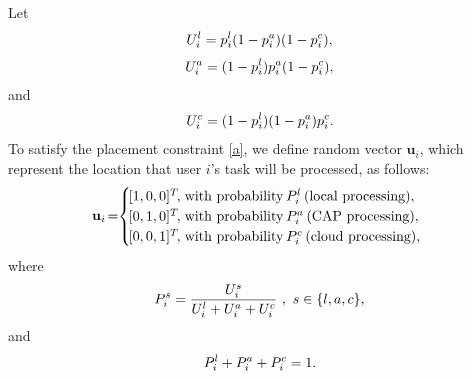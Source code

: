 \documentclass[10pt,journal,compsoc]{IEEEtran}
\begin{document}
{Let
\begin{align}
U^l_i=p^l_i(1-p^a_i)(1-p^c_i),\nonumber\allowdisplaybreaks
\end{align}
\begin{align}
U^a_i=(1-p^l_i)p^a_i(1-p^c_i),\nonumber\allowdisplaybreaks
\end{align}
and
\begin{align}
U^c_i=(1-p^l_i)(1-p^a_i)p^c_i.\nonumber\allowdisplaybreaks
\end{align}
To satisfy the placement constraint \eqref{a}, we define random
vector $\mathbf{u}_i$, which represent the location that user $i$'s
task will be processed, as follows:
\begin{equation}\label{Eq_u_i}
\hspace*{-.15cm}\mathbf{u}_i \hspace*{-.05cm}=\hspace*{-.1cm}
\begin{cases}
\hspace*{-.05cm}[1,0,0]^T\hspace*{-.05cm},&\hspace*{-.25cm}\text{with probability}\ \hspace*{-.05cm}P^l_i\ \hspace*{-.05cm}\text{(local processing)},\\
\hspace*{-.05cm}[0,1,0]^T\hspace*{-.05cm},&\hspace*{-.25cm}\text{with probability}\ \hspace*{-.05cm}P^a_i\ \hspace*{-.05cm}\text{(CAP processing)},\\
\hspace*{-.05cm}[0,0,1]^T\hspace*{-.05cm},&\hspace*{-.25cm}\text{with probability}\ \hspace*{-.05cm}P^c_i\ \hspace*{-.05cm}\text{(cloud processing)},\\
\end{cases}
\end{equation}
where
\begin{align}
P^s_i=\frac{U^s_i}{U^l_i+U^a_i+U^c_i}\ ,\
s\in\{l,a,c\},\nonumber\allowdisplaybreaks
\end{align}
and
\begin{align}
P^l_i+P^a_i+P^c_i=1.\nonumber\allowdisplaybreaks
\end{align}
}
\end{document}
